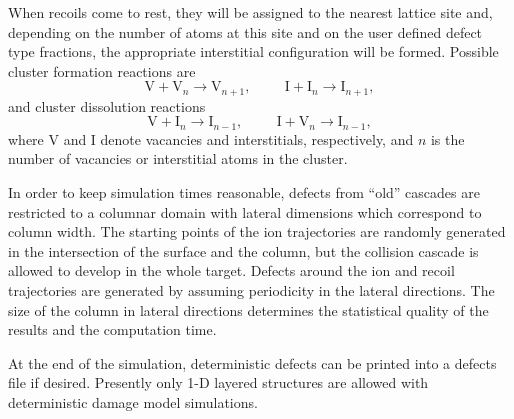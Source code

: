 When recoils come to rest, they will be assigned to the nearest lattice site
and, depending on the number of atoms at this site and on the user defined
defect type fractions, the appropriate interstitial configuration will be
formed.  Possible cluster formation reactions are
%
\begin{equation}
    \mathrm{V} + \mathrm{V}_{n} \rightarrow \mathrm{V}_{n+1}, \hspace{1cm} 
    \mathrm{I} + \mathrm{I}_{n} \rightarrow \mathrm{I}_{n+1}, 
\end{equation}
%
and cluster dissolution reactions
%
\begin{equation}
    \mathrm{V} + \mathrm{I}_n \rightarrow \mathrm{I}_{n-1},
    \hspace{1cm} \mathrm{I} + \mathrm{V}_{n} \rightarrow
    \mathrm{I}_{n-1} ,
\end{equation}
%
where V and I denote vacancies and interstitials, respectively, and 
$n$ is the number of vacancies or interstitial atoms in the cluster.

In order to keep simulation times reasonable, defects from ``old'' cascades are
restricted to a columnar domain with lateral dimensions which correspond to
column width. The starting points of the ion trajectories are
randomly generated in the intersection of the surface and the column, but the
collision cascade is allowed to develop in the whole target. Defects around
the ion and recoil trajectories are generated by assuming periodicity in the
lateral directions. The size of the column in lateral directions determines
the statistical quality of the results and the computation time.

At the end of the simulation, deterministic defects can be printed into a
defects file if desired. Presently only 1-D layered structures are allowed with
deterministic damage model simulations. 

